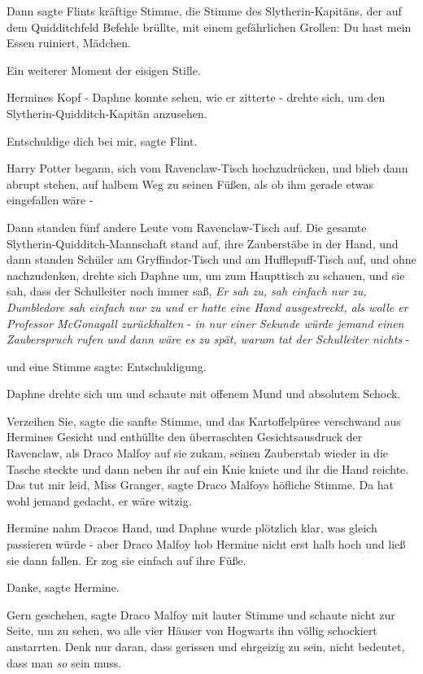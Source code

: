 Dann sagte Flints kräftige Stimme, die Stimme des Slytherin-Kapitäns, der auf
dem Quidditchfeld Befehle brüllte, mit einem gefährlichen Grollen: \glqq Du hast
mein Essen ruiniert, Mädchen.\grqq{}

Ein weiterer Moment der eisigen Stille.

Hermines Kopf - Daphne konnte sehen, wie er zitterte - drehte sich, um den
Slytherin-Quidditch-Kapitän anzusehen.

\glqq Entschuldige dich bei mir\grqq{}, sagte Flint.

Harry Potter begann, sich vom Ravenclaw-Tisch hochzudrücken, und blieb dann
abrupt stehen, auf halbem Weg zu seinen Füßen, als ob ihm gerade etwas
eingefallen wäre -

Dann standen fünf andere Leute vom Ravenclaw-Tisch auf. Die gesamte
Slytherin-Quidditch-Mannschaft stand auf, ihre Zauberstäbe in der Hand, und dann
standen Schüler am Gryffindor-Tisch und am Hufflepuff-Tisch auf, und ohne
nachzudenken, drehte sich Daphne um, um zum Haupttisch zu schauen, und sie sah,
dass der Schulleiter noch immer saß, \emph{Er sah zu, sah einfach nur zu,
Dumbledore sah einfach nur zu und er hatte eine Hand ausgestreckt, als wolle er
Professor McGonagall zurückhalten }- \emph{in nur einer Sekunde würde jemand
einen Zauberspruch rufen und dann wäre es zu spät, warum tat der Schulleiter
nichts} -

und eine Stimme sagte: \glqq Entschuldigung.\grqq{}

Daphne drehte sich um und schaute mit offenem Mund und absolutem Schock.

\glqq Verzeihen Sie\grqq{}, sagte die sanfte Stimme, und das Kartoffelpüree
verschwand aus Hermines Gesicht und enthüllte den überraschten Gesichtsausdruck
der Ravenclaw, als Draco Malfoy auf sie zukam, seinen Zauberstab wieder in die
Tasche steckte und dann neben ihr auf ein Knie kniete und ihr die Hand reichte.
\glqq Das tut mir leid, Miss Granger\grqq{}, sagte Draco Malfoys höfliche
Stimme. \glqq Da hat wohl jemand gedacht, er wäre witzig.\grqq{}

Hermine nahm Dracos Hand, und Daphne wurde plötzlich klar, was gleich passieren
würde - aber Draco Malfoy hob Hermine nicht erst halb hoch und ließ sie dann
fallen. Er zog sie einfach auf ihre Füße.

\glqq Danke\grqq{}, sagte Hermine.

\glqq Gern geschehen\grqq{}, sagte Draco Malfoy mit lauter Stimme und schaute
nicht zur Seite, um zu sehen, wo alle vier Häuser von Hogwarts ihn völlig
schockiert anstarrten. \glqq Denk nur daran, dass gerissen und ehrgeizig zu
sein, nicht bedeutet, dass man \emph{so} sein muss.\grqq{}

